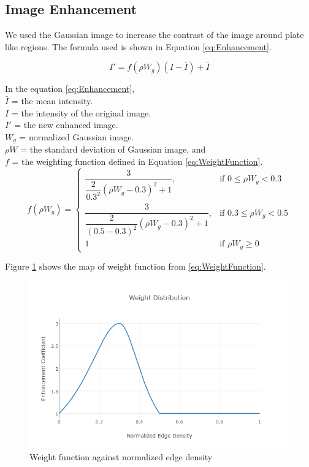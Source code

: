 \documentclass{standalone}
\begin{document}
\subsection{Image Enhancement}
We used the Gaussian image to increase the contrast of the image around plate like regions. The formula used is shown in Equation \ref{eq:Enhancement}.

\begin{equation} \label{eq:Enhancement}
I' = f(\rho W_g) (I - \bar{I}) + \bar{I}
\end{equation}

In the equation \ref{eq:Enhancement},\\
$\bar{I}$ = the mean intensity. \\
$I$ = the intensity of the original image. \\
$I'$ = the new enhanced image. \\
$W_g$ = normalized Gaussian image. \\ 
$\rho W$ = the standard deviation of Gaussian image, and \\
$f$ = the weighting function defined in Equation \ref{eq:WeightFunction}.
\begin{equation} \label{eq:WeightFunction}
f(\rho W_g) = 
\begin{cases} 
	\dfrac{3}{ \dfrac{2}{0.3^2} ( \rho W_g - 0.3)^2 + 1 },
    	& \mbox{if } 0 \leq \rho W_g < 0.3  
     \\
    
    \dfrac{3}{ \dfrac{2}{(0.5 - 0.3)^2} ( \rho W_g - 0.3)^2 + 1 },
    	& \mbox{if } 0.3 \leq \rho W_g < 0.5  
     \\
        
    1	& \mbox{if } \rho W_g \geq 0
\end{cases}
\end{equation} 

Figure \ref{fig:WeightDistribution} shows the map of weight function from \ref{eq:WeightFunction}.
\begin{figure}
	\centering
	\includegraphics[width=.8\linewidth]{./img/plots/weight.png}
	\caption{Weight function against normalized edge density} 
	\label{fig:WeightDistribution}
\end{figure}
\end{document}
